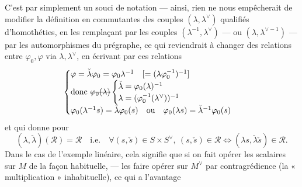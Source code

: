 \documentclass[11pt,a4paper]{article}
\begin{document}
C'est par simplement  un souci de notation — ainsi, rien ne
nous empêcherait de modifier la définition en 
commutantes des couples $(\lambda, \lambda^{\vee})$ qualifiés
d'homothéties, en les remplaçant par les couples $(\lambda^{-1}, \lambda^{\vee})$ — ou
$(\lambda, \lambda^{\vee -1})$ — par les automorphismes du prégraphe, ce qui
reviendrait à changer des relations entre $\varphi_0, \varphi$ via
$\lambda, \lambda^{\vee}$, en écrivant par ces relations
\[
\begin{cases}
\varphi = \check{\lambda} \varphi_0 = \varphi_0 \lambda^{-1} \quad [= (\lambda \varphi_0^{-1})^{-1}] \\
\text{donc } \text{\struck{$\varphi_0(\lambda)$}}
\begin{cases}
\check{\lambda} = \varphi_0(\lambda)^{-1} \\
\lambda = (\varphi_0^{-1}(\lambda^{\vee}))^{-1}
\end{cases} \\
\varphi_0(\lambda^{-1} s) = \check{\lambda} \varphi_0(s) \quad \text{ou} \quad \varphi_0(\lambda s) = \check{\lambda}^{-1} \varphi_0(s)
\end{cases}
\]
et qui donne pour 
\[
(\lambda, \check{\lambda})(\mathcal{R}) = \mathcal{R} \quad \text{i.e.} \quad
\forall (s, \check{s}) \in S \times S^{\vee},\ (s, \check{s}) \in \mathcal{R} \Longleftrightarrow (\lambda s, \check{\lambda} \check{s}) \in \mathcal{R} .
\]
Dans le cas de l'exemple linéaire, cela signifie que si on fait opérer les
scalaires\add{$\in \Lambda^{*}$} sur $M$ de la façon habituelle, — les
faire opérer sur $M^{\vee}$ par contragrédience (la « multiplication »
inhabituelle), ce qui a l'avantage
\end{document}
